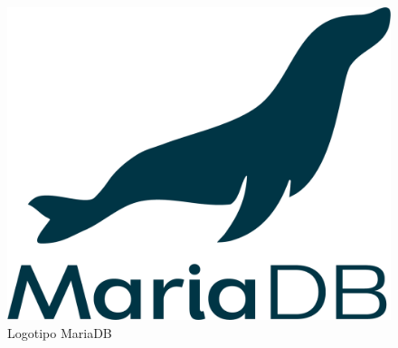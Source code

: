 \documentclass[11pt,spanish,listoffigures,listoftables]{tfgetsinf}
\begin{document}
\begin{figure}[!htb]
   \includegraphics[width=\linewidth]{img/mariadb_logo.png}
   \caption{Logotipo MariaDB}\label{fig:LogoMariaDB}
 \endminipage\hfill
\end{figure}
\end{document}
